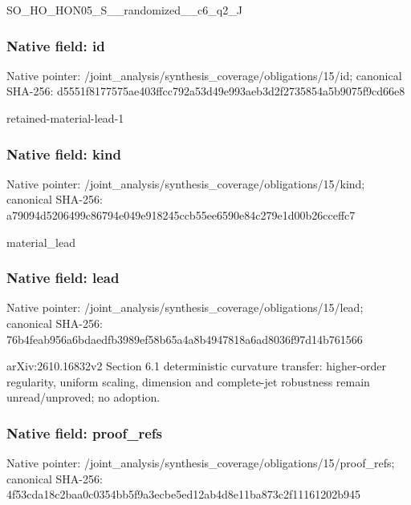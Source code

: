 \documentclass[10pt,a4paper]{article}
\begin{document}
\begingroup\raggedright\sloppy SO\_\allowbreak{}HO\_\allowbreak{}HON05\_\allowbreak{}S\_\allowbreak{}\_\allowbreak{}randomized\_\allowbreak{}\_\allowbreak{}c6\_\allowbreak{}q2\_\allowbreak{}J\par\endgroup

\subsubsection{Native field: id}
Native pointer: /joint\_\allowbreak{}analysis/synthesis\_\allowbreak{}coverage/obligations/15/id; canonical SHA-256: d5551f8177575ae403ffcc792a53d49e993aeb3d2f2735854a5b9075f9cd66e8

\begingroup\raggedright\sloppy retained-material-lead-1\par\endgroup

\subsubsection{Native field: kind}
Native pointer: /joint\_\allowbreak{}analysis/synthesis\_\allowbreak{}coverage/obligations/15/kind; canonical SHA-256: a79094d5206499c86794e049e918245ccb55ee6590e84c279e1d00b26cceffc7

\begingroup\raggedright\sloppy material\_\allowbreak{}lead\par\endgroup

\subsubsection{Native field: lead}
Native pointer: /joint\_\allowbreak{}analysis/synthesis\_\allowbreak{}coverage/obligations/15/lead; canonical SHA-256: 76b4feab956a6bdaedfb3989ef58b65a4a8b4947818a6ad8036f97d14b761566

\begingroup\raggedright\sloppy arXiv:\allowbreak{}2610.16832v2 Section 6.1 deterministic curvature transfer:\allowbreak{} higher-order regularity,\allowbreak{} uniform scaling,\allowbreak{} dimension and complete-jet robustness remain unread/\allowbreak{}unproved;\allowbreak{} no adoption.\par\endgroup

\subsubsection{Native field: proof\_\allowbreak{}refs}
Native pointer: /joint\_\allowbreak{}analysis/synthesis\_\allowbreak{}coverage/obligations/15/proof\_\allowbreak{}refs; canonical SHA-256: 4f53cda18c2baa0c0354bb5f9a3ecbe5ed12ab4d8e11ba873c2f11161202b945
\end{document}
